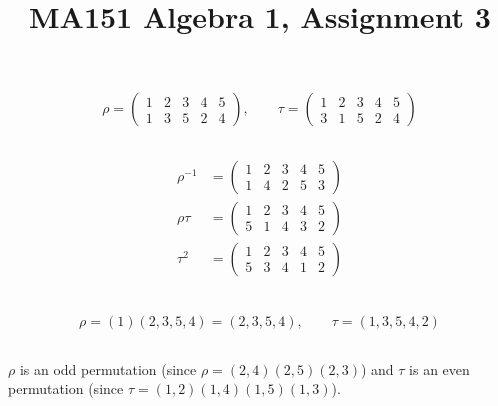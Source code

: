 \documentclass[a4paper]{article}
\title{MA151 Algebra 1, Assignment 3}
\begin{document}
\maketitle

\setlength{\parindent}{0em}
\setlength{\parskip}{1em}

\renewcommand{\thesubsection}{Q\arabic{section}~\roman{subsection}.}

$$\rho = \begin{pmatrix}1 & 2 & 3 & 4 & 5\\ 1 & 3 & 5 & 2 & 4\end{pmatrix}, \qquad \tau = \begin{pmatrix}1 & 2 & 3 & 4 & 5\\ 3 & 1 & 5 & 2 & 4\end{pmatrix}$$

\subsection{}

\begin{align*}
	\rho^{-1} &= \begin{pmatrix}1 & 2 & 3 & 4 & 5\\ 1 & 4 & 2 & 5 & 3\end{pmatrix}\\[1ex]
	\rho\tau  &= \begin{pmatrix}1 & 2 & 3 & 4 & 5\\ 5 & 1 & 4 & 3 & 2\end{pmatrix}\\[1ex]
	\tau^2    &= \begin{pmatrix}1 & 2 & 3 & 4 & 5\\ 5 & 3 & 4 & 1 & 2\end{pmatrix}\\[1ex]
\end{align*}

\subsection{}

$$\rho = (1) (2, 3, 5, 4) = (2, 3, 5, 4), \qquad \tau = (1, 3, 5, 4, 2)$$

\subsection{}

$\rho$ is an odd permutation (since $\rho = (2, 4) (2, 5) (2, 3)$) and $\tau$ is an even permutation (since $\tau = (1, 2) (1, 4) (1, 5) (1, 3)$).
\end{document}
